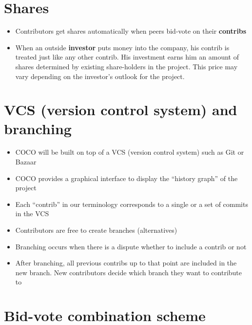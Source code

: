 \documentclass[12pt, orivec]{article}
\begin{document}
\secttoc
\section{Shares}

\begin{itemize}
	\item Contributors get shares automatically when peers bid-vote on their \textbf{contribs}
	
	\item When an outside \textbf{investor} puts money into the company, his contrib is treated just like any other contrib.  His investment earns him an amount of shares determined by existing share-holders in the project.  This price may vary depending on the investor's outlook for the project.	
\end{itemize}

\secttoc
\section{VCS (version control system) and branching}

\begin{itemize}
	\item COCO will be built on top of a VCS (version control system) such as Git or Bazaar
	
	\item COCO provides a graphical interface to display the ``history graph'' of the project
	
	\item Each ``contrib'' in our terminology corresponds to a single or a set of commits in the VCS
	
	\item Contributors are free to create branches (alternatives)

	\item Branching occurs when there is a dispute whether to include a contrib or not

	\item After branching, all previous contribs up to that point are included in the new branch.  New contributors decide which branch they want to contribute to
\end{itemize}

\secttoc
\section{Bid-vote combination scheme}
\end{document}
